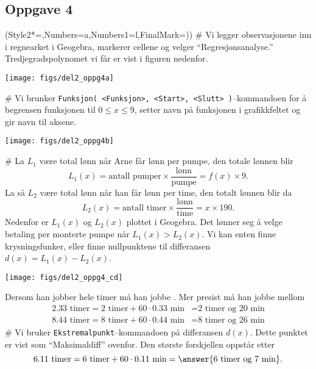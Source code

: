\subsection*{Oppgave 4}
\begin{easylist}[enumerate]
	\ListProperties(Style2*=,Numbers=a,Numbers1=l,FinalMark={)})
	# Vi legger observasjonene inn i regnearket i Geogebra, markerer cellene og velger ``Regresjonsanalyse.'' Tredjegradspolynomet vi får er vist i figuren nedenfor.
	\begin{center}
		\texttt{[image: figs/del2\_oppg4a]}
	\end{center}
	# Vi brunker \verb|Funksjon( <Funksjon>, <Start>, <Slutt> )|--kommandoen
	for å begrensen funksjonen til $0 \leq x \leq 9$, setter navn på funksjonen i grafikkfeltet og gir navn til aksene.
	\begin{center}
		\texttt{[image: figs/del2\_oppg4b]}
	\end{center}
	# La $L_1$ være total lønn når Arne får lønn per pumpe, den totale lønnen blir
	\begin{equation*}
		L_1(x) = \text{antall pumper} \times \frac{\text{lønn}}{\text{pumpe}}
		= f(x) \times 9.
	\end{equation*}
	La så $L_2$ være total lønn når han får lønn per time, den totalt lønnen blir da 
	\begin{equation*}
	L_2(x) = \text{antall timer} \times \frac{\text{lønn}}{\text{time}}
	= x \times 190.
	\end{equation*}
	Nedenfor er $L_1(x)$ og $L_2(x)$ plottet i Geogebra. Det lønner seg å velge betaling per monterte pumpe når $L_1(x) > L_2(x)$.
	Vi kan enten finne krysningsfunker, eller finne nullpunktene til differansen $d(x) = L_1(x) - L_2(x)$.
	\begin{center}
		\texttt{[image: figs/del2\_oppg4\_cd]}
	\end{center}
	Dersom han jobber hele timer må han jobbe .
	Mer presist må han jobbe mellom
	\begin{align*}
		2.33 \text{ timer} = 2 \text{ timer} +  60 \cdot 0.33 \text{ min} &= \text{2 timer og 20 min} \\
		8.44 \text{ timer} = 8 \text{ timer} +  60 \cdot 0.44 \text{ min} &= \text{8 timer og 26 min}
	\end{align*}
	# Vi bruker \verb|Ekstremalpunkt|--kommandoen på differansen $d(x)$. Dette punktet er vist som  ``Maksimaldiff'' ovenfor. Den største forskjellen oppstår etter
	\begin{equation*}
		6.11 \text{ timer} = 6 \text{ timer} +  60 \cdot 0.11 \text{ min} = \answer{\text{6 timer og 7 min}}.
	\end{equation*}
\end{easylist}




